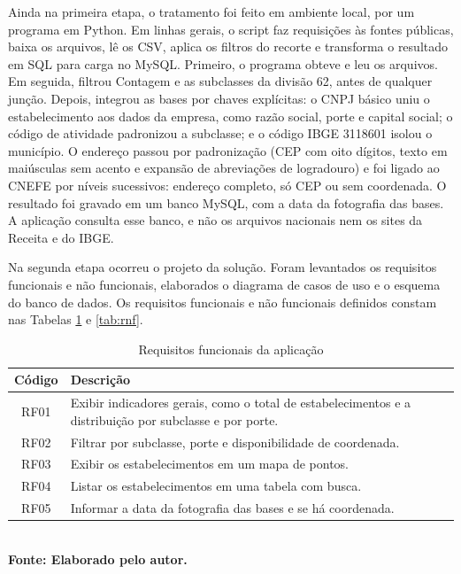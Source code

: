 Ainda na primeira etapa, o tratamento foi feito em ambiente local, por um programa em Python.
Em linhas gerais, o script faz requisições às fontes públicas, baixa os arquivos, lê os CSV, aplica os filtros do recorte e transforma o resultado em SQL para carga no MySQL.
Primeiro, o programa obteve e leu os arquivos.
Em seguida, filtrou Contagem e as subclasses da divisão 62, antes de qualquer junção.
Depois, integrou as bases por chaves explícitas: o CNPJ básico uniu o estabelecimento aos dados da empresa, como razão social, porte e capital social; o código de atividade padronizou a subclasse; e o código IBGE 3118601 isolou o município.
O endereço passou por padronização (CEP com oito dígitos, texto em maiúsculas sem acento e expansão de abreviações de logradouro) e foi ligado ao CNEFE por níveis sucessivos: endereço completo, só CEP ou sem coordenada.
O resultado foi gravado em um banco MySQL, com a data da fotografia das bases.
A aplicação consulta esse banco, e não os arquivos nacionais nem os sites da Receita e do IBGE.

Na segunda etapa ocorreu o projeto da solução.
Foram levantados os requisitos funcionais e não funcionais, elaborados o diagrama de casos de uso e o esquema do banco de dados.
Os requisitos funcionais e não funcionais definidos constam nas Tabelas \ref{tab:rf} e \ref{tab:rnf}.

\begin{table}[H]
    \centering
    \caption{Requisitos funcionais da aplicação}
    \label{tab:rf}
    \begin{tabular}{|c|p{11.5cm}|}
        \hline
        \textbf{Código} & \textbf{Descrição} \\
        \hline
        RF01 & Exibir indicadores gerais, como o total de estabelecimentos e a distribuição por subclasse e por porte. \\
        \hline
        RF02 & Filtrar por subclasse, porte e disponibilidade de coordenada. \\
        \hline
        RF03 & Exibir os estabelecimentos em um mapa de pontos. \\
        \hline
        RF04 & Listar os estabelecimentos em uma tabela com busca. \\
        \hline
        RF05 & Informar a data da fotografia das bases e se há coordenada. \\
        \hline
    \end{tabular}
    \\\textbf{\footnotesize Fonte: Elaborado pelo autor.}
\end{table}

